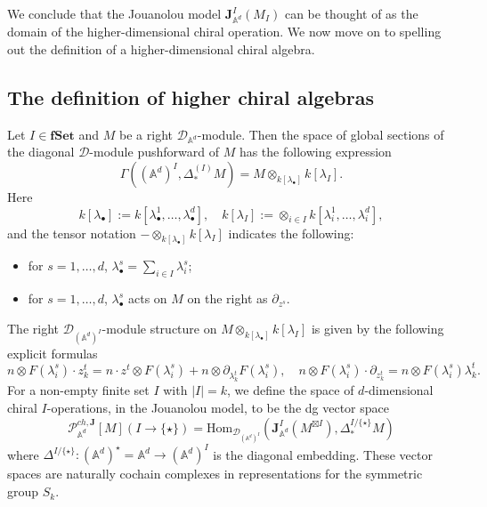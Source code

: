 \documentclass[11pt]{amsart}
\theoremstyle{definition}
\theoremstyle{remark}
\numberwithin{equation}{section}
\begin{document}
    We conclude that the Jouanolou model $\mathbf{J}_{\mathbb{A}^d}^{{I}}(M_{{I}})$ can be thought of as the domain of the higher-dimensional chiral operation.
    We now move on to spelling out the definition of a higher-dimensional chiral algebra.

    \subsection{The definition of higher chiral algebras}

Let ${I}\in {\mathbf{fSet}}$ and $M$ be a right $\mathcal{D}_{\mathbb{A}^d}$-module. Then the space of global sections
of the diagonal $\mathcal{D}$-module pushforward of $M$ has the following expression
$$
\Gamma\left((\mathbb{A}^d)^{{I}},\Delta_*^{({I})}M\right)=M\otimes_{k[\lambda_{\bullet}]}k[\lambda_I].
$$
Here
$$
k[\lambda_{\bullet}]:=k[\lambda^1_{\bullet},\dots,\lambda^d_{\bullet}], \quad k[\lambda_{I}]:=\otimes_{{i\in I}}k[\lambda^1_{i},\dots,\lambda^d_{i}],
$$
and the tensor notation $-\otimes_{k[\lambda_{\bullet}]}k[\lambda_I]$ indicates the following:
\begin{itemize}
  \item for $s=1,\dots,d$, $\lambda^s_{\bullet}=\sum\limits_{i\in I}\lambda^s_i$;
  \item for $s=1,\dots,d$, $\lambda^s_{\bullet}$ acts on $M$ on the right as $\partial_{z^s}$.
\end{itemize}
The right $\mathcal{D}_{(\mathbb{A}^d)^{{I}}}$-module structure on $M\otimes_{k[\lambda_{\bullet}]}k[\lambda_I]$ is given by the following explicit formulas
$$
n\otimes F(\lambda^s_i)\cdot z^t_k=n \cdot z^t\otimes F(\lambda^s_i)+n\otimes \partial_{\lambda^t_k}F(\lambda^s_i),\quad n\otimes F(\lambda^s_i)\cdot \partial_{z^t_k}=n\otimes F(\lambda^s_i)\lambda^t_k.
$$
For a non-empty finite set $I$ with $|I|=k$, we define the space of $d$-dimensional chiral $I$-operations, in the Jouanolou model,
to be the dg vector space
$$
\mathcal{P}^{ch,\mathbf{J}}_{\mathbb{A}^d}[M](I\rightarrow \{\star\})=\mathrm{Hom}_{\mathcal{D}_{(\mathbb{A}^d)^{I}}}\left(\mathbf{J}_{\mathbb{A}^d}^{I}(M^{\boxtimes I}),\Delta^{I/\{\star\}}_*M\right)
$$
where $\Delta^{I/\{\star\}} \colon (\mathbb{A}^d)^{\star} = \mathbb{A}^d \to (\mathbb{A}^d)^{I}$ is the diagonal
embedding.
These vector spaces are naturally cochain complexes in representations for the symmetric group $S_k$.
\end{document}
